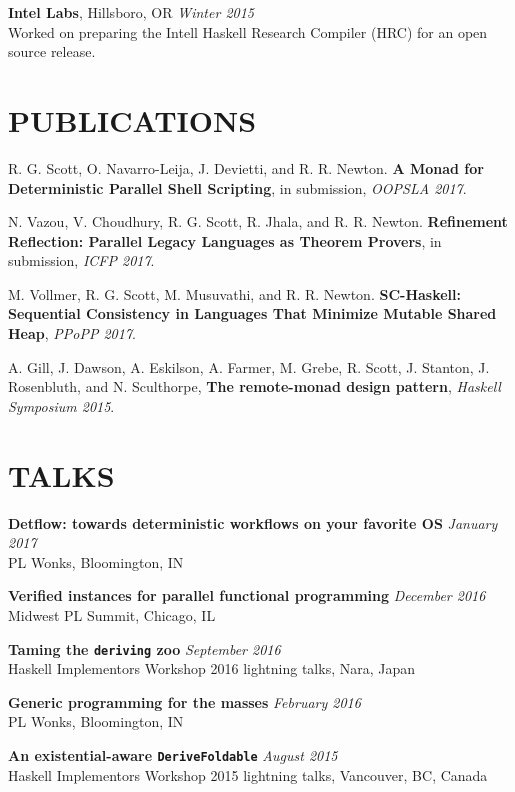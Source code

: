 \documentclass{res}
\begin{document}
\begin{resume}
    \textbf{Intel Labs}, Hillsboro, OR \hfill \textit{Winter 2015} \\
    Worked on preparing the Intell Haskell Research Compiler (HRC) for an open source release.

\section{PUBLICATIONS}
    R. G. Scott, O. Navarro-Leija, J. Devietti, and R. R. Newton. \textbf{A Monad for Deterministic Parallel Shell Scripting}, in submission, \textit{OOPSLA 2017}.

    N. Vazou, V. Choudhury, R. G. Scott, R. Jhala, and R. R. Newton. \textbf{Refinement Reflection: Parallel Legacy Languages as Theorem Provers}, in submission, \textit{ICFP 2017}.

    M. Vollmer, R. G. Scott, M. Musuvathi, and R. R. Newton. \textbf{SC-Haskell: Sequential Consistency in Languages That Minimize Mutable Shared Heap}, \textit{PPoPP 2017}.

    A. Gill, J. Dawson, A. Eskilson, A. Farmer, M. Grebe, R. Scott, J. Stanton, J. Rosenbluth, and N. Sculthorpe, \textbf{The remote-monad design pattern}, \textit{Haskell Symposium 2015}.


\section{TALKS}
    \textbf{Detflow: towards deterministic workflows on your favorite OS} \hfill \textit{January 2017} \\
    PL Wonks, Bloomington, IN

    \textbf{Verified instances for parallel functional programming} \hfill \textit{December 2016} \\
    Midwest PL Summit, Chicago, IL

    \textbf{Taming the \texttt{deriving} zoo} \hfill \textit{September 2016} \\
    Haskell Implementors Workshop 2016 lightning talks, Nara, Japan

    \textbf{Generic programming for the masses} \hfill \textit{February 2016} \\
    PL Wonks, Bloomington, IN

    \textbf{An existential-aware \texttt{DeriveFoldable}} \hfill \textit{August 2015} \\
    Haskell Implementors Workshop 2015 lightning talks, Vancouver, BC, Canada


\end{resume}
\end{document}
